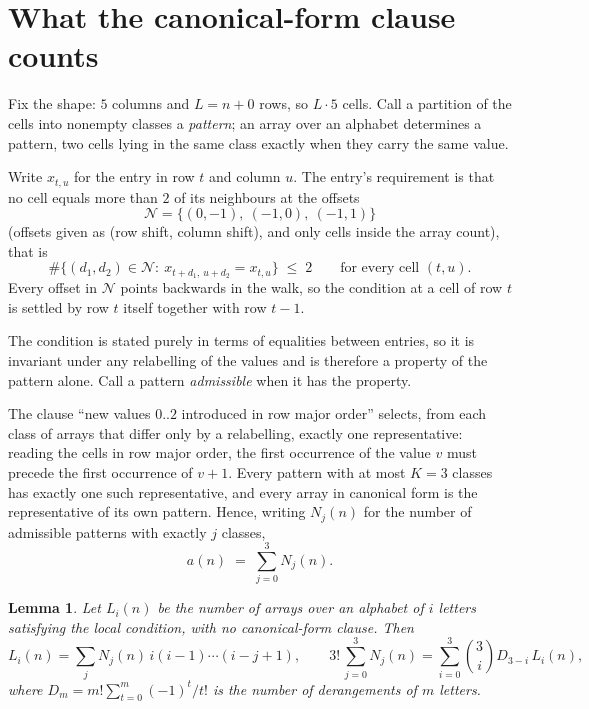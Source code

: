 \documentclass[11pt,a4paper]{article}
\theoremstyle{plain}
\newtheorem{lemma}[theorem]{Lemma}
\theoremstyle{definition}
\begin{document}
\section{What the canonical-form clause counts}

Fix the shape: $5$ columns and $L=n+0$ rows, so $L\cdot5$ cells. Call a
partition of the cells into nonempty classes a \emph{pattern}; an array over an alphabet
determines a pattern, two cells lying in the same class exactly when they carry the same
value.

Write $x_{t,u}$ for the entry in row $t$ and column $u$. The
entry's requirement is that no cell equals more than $2$ of its neighbours at the
offsets
\[
\mathcal N=\{(0,-1),\ (-1,0),\ (-1,1)\}
\]
(offsets given as (row shift, column shift), and only cells inside the array count),
that is
\begin{equation}\label{eq:loc}
\#\bigl\{(d_1,d_2)\in\mathcal N:\ x_{t+d_1,\,u+d_2}=x_{t,u}\bigr\}\;\le\;2
\qquad\text{for every cell }(t,u).
\end{equation}
Every offset in $\mathcal N$ points backwards in the walk, so the condition at a cell of
row $t$ is settled by row $t$ itself together with row $t-1$.

The condition is stated purely in terms of equalities between entries, so it is invariant
under any relabelling of the values and is therefore a property of the pattern alone. Call a
pattern \emph{admissible} when it has the property.

The clause ``new values $0..2$ introduced in row major order'' selects, from each class
of arrays that differ only by a relabelling, exactly one representative: reading the cells in
row major order, the first occurrence of the value $v$ must precede the first occurrence of
$v+1$. Every pattern with at most $K=3$ classes has exactly one such representative, and
every array in canonical form is the representative of its own pattern. Hence, writing
$N_j(n)$ for the number of admissible patterns with exactly $j$ classes,
\begin{equation}\label{eq:apat}
a(n)\;=\;\sum_{j=0}^{3}N_j(n).
\end{equation}

\begin{lemma}\label{lem:inv}
Let $L_i(n)$ be the number of arrays over an alphabet of $i$ letters satisfying the local
condition, with no canonical-form clause. Then
\[
L_i(n)=\sum_j N_j(n)\,i(i-1)\cdots(i-j+1),
\qquad
3!\,\sum_{j=0}^{3}N_j(n)=\sum_{i=0}^{3}\binom{3}{i}D_{3-i}\,L_i(n),
\]
where $D_m=m!\sum_{t=0}^{m}(-1)^t/t!$ is the number of derangements of $m$ letters.
\end{lemma}
\end{document}
